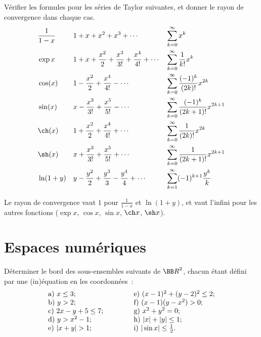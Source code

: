 \documentclass[12pt,french,oneside,a4paper]{memoir} %
\begin{document}
\begin{exo}
  Vérifier les formules pour les séries de Taylor suivantes, et donner le rayon de convergence dans chaque cas.
  \begin{align*}
    & \frac{1}{1-x} &  & 1 + x + x^{2} + x^{3} + \cdots
    &               & \sum_{k=0}^{\infty} x^{k}                              \\
    & \exp{x}       &  & 1 + x + \frac{x^{2}}{2} + \frac{x^{3}}{3!} + \frac{x^{4}}{4!} + \cdots
    &               & \sum_{k=0}^{\infty} \frac {1} {k!}x^{k}                \\
    & \cos(x)       &  & 1 - \frac{x^{2}}{2} + \frac{x^{4}}{4!} - \cdots
    &               & \sum_{k=0}^{\infty} \frac {(-1)^{k}} {(2k)!}x^{2k}     \\
    & \sin(x)       &  & x - \frac{x^{3}}{3!} + \frac{x^{5}}{5!} - \cdots
    &               & \sum_{k=0}^{\infty} \frac {(-1)^{k}} {(2k+1)!}x^{2k+1} \\
    & \ch(x)        &  & 1 + \frac{x^{2}}{2} + \frac{x^{4}}{4!} + \cdots
    &               & \sum_{k=0}^{\infty} \frac {1} {(2k)!}x^{2k}            \\
    & \sh(x)        &  & x + \frac{x^{3}}{3!} + \frac{x^{5}}{5!} + \cdots
    &               & \sum_{k=0}^{\infty} \frac {1} {(2k+1)!}x^{2k+1}        \\
    & \ln(1+y)        &  & y - \frac{y^{2}}{2} + \frac{y^{3}}{3} - \frac{y^{4}}{4} + \cdots
    &               & \sum_{k=1}^{\infty} (-1)^{k+1} \frac{y^{k}}{k}               \\
  \end{align*}
  \begin{correction}
    Le rayon de convergence vaut $1$ pour $\frac{1}{1-x}$ et $\ln(1+y)$, et vaut l'infini pour les autres fonctions ($\exp x$, $\cos x$, $\sin x$, $\ch x$, $\sh x$).
\end{correction}
\end{exo}

\chapter{Espaces numériques}
\begin{exo}\label{sous ensembles du plan}
Déterminer le bord des sous-ensembles suivants de ${\BB R}^2$, chacun
étant défini par une (in)équation en les coordonnées~:
\begin{equation*}
\begin{array}{l@{\qquad\qquad}l}
\mbox{a) } x \leq 3; &\mbox{ e) } (x-1)^2+(y-2)^2 \leq 2; \\
\mbox{b) } y > 2; &\mbox{ f) } (x-1)(y-x^2) > 0; \\
\mbox{c) } 2x-y+5 \leq 7; &\mbox{ g) } x^2+y^2 =0; \\
\mbox{d) } y> x^2-1; &\mbox{ h) } \vert x \vert +\vert y\vert \leq 1; \\
\mbox{e) } \vert x + y \vert > 1; &\mbox{ i) } \vert \sin x \vert \leq \frac{1}{2}.
\end{array}
\end{equation*}
\end{exo}
\end{document}
